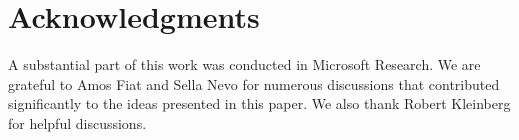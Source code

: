 \section*{Acknowledgments}

	A substantial part of this work was conducted in Microsoft Research. We are grateful to Amos Fiat and Sella Nevo for numerous discussions that contributed significantly to the ideas presented in this paper. We also thank Robert Kleinberg for helpful discussions.

\nocite{conf-version}
